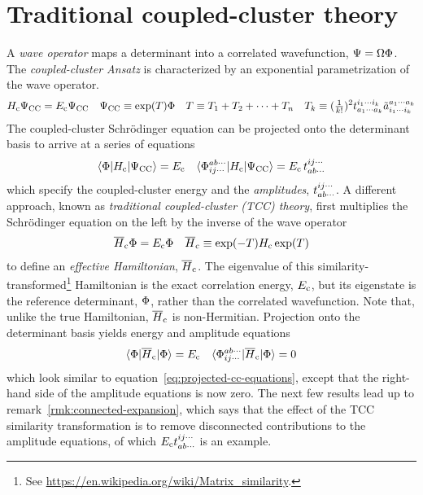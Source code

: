 \documentclass[11pt]{article}
\numberwithin{equation}{section}
\begin{document}
\setlength{\abovedisplayskip}{3pt}
\setlength{\belowdisplayskip}{3pt}

\setcounter{section}{4}
\section{Traditional coupled-cluster theory}

\begin{dfn}\label{dfn:cc-effective-hamiltonian}
A \textit{wave operator} maps a determinant into a correlated wavefunction, $\Psi =\Omega \Phi $.
The \textit{coupled-cluster Ansatz} is characterized by an exponential parametrization of the wave operator.
\begin{align}
\label{eq:cc-effective-hamiltonian}
  H_{\mathrm{c}}\Psi _{\mathrm{CC}}
=
  E_{\mathrm{c}}\Psi _{\mathrm{CC}}
&&
  \Psi _{\mathrm{CC}}
\equiv
  \mathrm{exp}(T)
  \Phi 
&&
  T
\equiv
  T_1
+
  T_2
+
  \cdots
+
  T_n
&&
  T_k
\equiv
  (\tfrac{1}{k!})^2
  t_{a_1\cdots a_k}^{i_1\cdots i_k}
  \tilde{a}^{a_1\cdots a_k}_{i_1\cdots i_k}
\end{align}
The coupled-cluster Schr\"odinger equation can be projected onto the determinant basis to arrive at a series of equations
\begin{align}
\label{eq:projected-cc-equations}
  \langle\Phi |H_{\mathrm{c}}|\Psi _{\mathrm{CC}}\rangle
=
  E_{\mathrm{c}}
&&
  \langle\Phi _{ij\cdots}^{ab\cdots}|H_{\mathrm{c}}|\Psi _{\mathrm{CC}}\rangle
=
  E_{\mathrm{c}}\,t_{ab\cdots}^{ij\cdots}
\end{align}
which specify the coupled-cluster energy and the \textit{amplitudes}, $t_{ab\cdots}^{ij\cdots}$.
A different approach, known as \textit{traditional coupled-cluster (TCC) theory}, first multiplies the Schr\"odinger equation on the left by the inverse of the wave operator
\begin{align}
  \overline{H}_{\mathrm{c}}
  \Phi 
=
  E_{\mathrm{c}}
  \Phi 
&&
  \overline{H}_{\mathrm{c}}
\equiv
  \mathrm{exp}(-T)
  H_{\mathrm{c}}\,
  \mathrm{exp}(T)
\end{align}
to define an \textit{effective Hamiltonian}, $\overline{H}_{\mathrm{c}}$.
The eigenvalue of this similarity-transformed\footnote{See \url{https://en.wikipedia.org/wiki/Matrix_similarity}.} Hamiltonian is the exact correlation energy, $E_{\mathrm{c}}$, but its eigenstate is the reference determinant, $\Phi $, rather than the correlated wavefunction.
Note that, unlike the true Hamiltonian, $\overline{H}_{\mathrm{c}}$ is non-Hermitian.
Projection onto the determinant basis yields energy and amplitude equations
\begin{align}
\label{eq:traditional-cc-equations}
  \langle\Phi |\overline{H}_{\mathrm{c}}|\Phi \rangle
=
  E_{\mathrm{c}}
&&
  \langle\Phi _{ij\cdots}^{ab\cdots}|\overline{H}_{\mathrm{c}}|\Phi \rangle
=
  0
\end{align}
which look similar to equation~\ref{eq:projected-cc-equations}, except that the right-hand side of the amplitude equations is now zero.
The next few results lead up to remark~\ref{rmk:connected-expansion}, which says that the effect of the TCC similarity transformation is to remove disconnected contributions to the amplitude equations, of which $E_{\mathrm{c}}t_{ab\cdots}^{ij\cdots}$ is an example.
\end{dfn}
\end{document}

